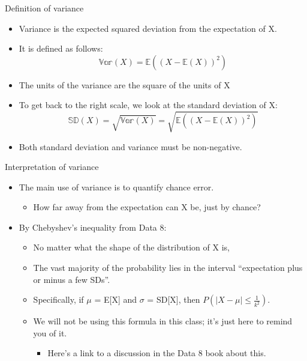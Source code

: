 \documentclass[aspectratio=169]{../latex_main/tntbeamer}  %
\begin{document}
	\begin{frame}{Definition of variance}
	    \begin{itemize}
	        \item Variance is the expected squared deviation from the expectation of X.
	        \item It is defined as follows:
	        \begin{equation*}
	            \mathbb{Var}(X) = \mathbb{E}((X - \mathbb{E}(X))^2)
	        \end{equation*}
	        \item The units of the variance are the square of the units of X
	        \item To get back to the right scale, we look at the standard deviation of X:
	        \begin{equation*}
	            \mathbb{SD}(X)  = \sqrt{\mathbb{Var}(X)}  =\sqrt{\mathbb{E}((X - \mathbb{E}(X))^2)}
	        \end{equation*}
	        \item Both standard deviation and variance must be non-negative.
	    \end{itemize}
	\end{frame}
	
	
	\begin{frame}[c]{Interpretation of variance}
	    \begin{itemize}
	        \item The main use of variance is to quantify chance error.
	        \begin{itemize}
	            \item How far away from the expectation can X be, just by chance?
	        \end{itemize}
	        \item By Chebyshev’s inequality from Data 8:
	        \begin{itemize}
	            \item No matter what the shape of the distribution of X is,
	            \item The vast majority of the probability lies in the interval “expectation plus or minus a few SDs”.
	            \item Specifically, if   $\mu$  = E[X] and    $\sigma$   = SD[X], then $P(|X - \mu| \leq \frac{1}{k^2})$.   
	            \item We will not be using this formula in this class; it’s just here to remind you of it.
	            \begin{itemize}
	                \item Here’s a link to a discussion in the Data 8 book about this.
	            \end{itemize}
	        \end{itemize}
	    \end{itemize}
	\end{frame}
	
\end{document}
